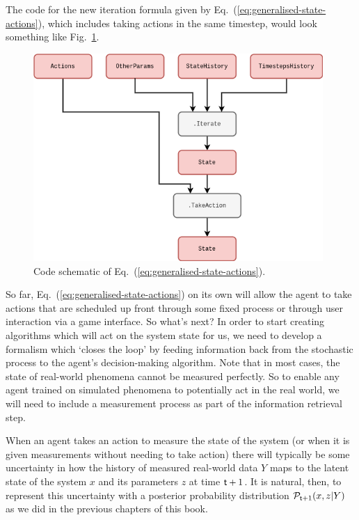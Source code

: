The code for the new iteration formula given by Eq.~(\ref{eq:generalised-state-actions}), which includes taking actions in the same timestep, would look something like Fig.~\ref{fig:iterations-with-actions}.

\begin{figure}[h]
\centering
\includegraphics[width=11cm]{images/chapter-9-iterations-with-actions.drawio.png}
\caption{Code schematic of Eq.~(\ref{eq:generalised-state-actions}).}
\label{fig:iterations-with-actions}
\end{figure}

So far, Eq.~(\ref{eq:generalised-state-actions}) on its own will allow the agent to take actions that are scheduled up front through some fixed process or through user interaction via a game interface. So what's next? In order to start creating algorithms which will act on the system state for us, we need to develop a formalism which `closes the loop' by feeding information back from the stochastic process to the agent's decision-making algorithm. Note that in most cases, the state of real-world phenomena cannot be measured perfectly. So to enable any agent trained on simulated phenomena to potentially act in the real world, we will need to include a measurement process as part of the information retrieval step.

When an agent takes an action to measure the state of the system (or when it is given measurements without needing to take action) there will typically be some uncertainty in how the history of measured real-world data $Y$ maps to the latent state of the system $x$ and its parameters $z$ at time ${\sf t}+1$. It is natural, then, to represent this uncertainty with a posterior probability distribution ${\cal P}_{{\sf t}+1}(x,z\vert Y)$ as we did in the previous chapters of this book. 

